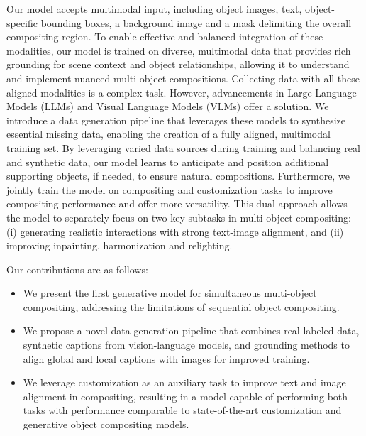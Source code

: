 Our model accepts multimodal input, including object images, text, object-specific bounding boxes, a background image and a mask delimiting the overall compositing region. To enable effective and balanced integration of these modalities, our model is trained on diverse, multimodal data that provides rich grounding for scene context and object relationships, allowing it to understand and implement nuanced multi-object compositions. Collecting data with all these aligned modalities is a complex task. However, advancements in Large Language Models (LLMs) \cite{liu2023improvedllava,driess2023palm,alayrac2022flamingo} and Visual Language Models (VLMs) \cite{liu2023groundingdino} offer a solution. We introduce a data generation pipeline that leverages these models to synthesize essential missing data, enabling the creation of a fully aligned, multimodal training set.
By leveraging varied data sources during training and balancing real and synthetic data, our model learns to anticipate and position additional supporting objects, if needed, to ensure natural compositions. Furthermore, we jointly train the model on compositing and customization tasks to improve compositing performance and offer more versatility. This dual approach allows the model to separately focus on two key subtasks in multi-object compositing: (i) generating realistic interactions with strong text-image alignment, and (ii) improving inpainting, harmonization and relighting. %

Our contributions are as follows:

\begin{itemize}
    \item We present the first generative model for simultaneous multi-object compositing, addressing the limitations of sequential object compositing.
    \item We propose a novel data generation pipeline that combines real labeled data, synthetic captions from vision-language models, and grounding methods to align global and local captions with images for improved training.
    \item We leverage customization as 
    an auxiliary
    task to improve text and image alignment in compositing, resulting in a model capable of performing both tasks with performance comparable to state-of-the-art customization and generative object compositing models.
\end{itemize}


